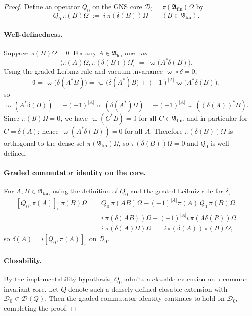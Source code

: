 \begin{proof}
Define an operator $Q_0$ on the GNS core $\mathcal D_0=\pi(\mathfrak A_{\mathrm{fin}})\Omega$
by
\[
Q_0\,\pi(B)\Omega \;:=\; i\,\pi(\delta(B))\Omega
\qquad(B\in\mathfrak A_{\mathrm{fin}}).
\]

\paragraph{Well-definedness.}
Suppose $\pi(B)\Omega=0$.  For any $A\in\mathfrak A_{\mathrm{fin}}$ one has
\[
\langle \pi(A)\Omega,\pi(\delta(B))\Omega\rangle
\;=\;
\varpi\!\big(A^*\delta(B)\big).
\]
Using the graded Leibniz rule and vacuum invariance $\varpi\circ\delta=0$,
\[
0
=\varpi\!\big(\delta(A^*B)\big)
=\varpi\!\big(\delta(A^*)B\big)+(-1)^{|A|}\varpi\!\big(A^*\delta(B)\big),
\]
so
$
\varpi(A^*\delta(B))=-(-1)^{|A|}\varpi(\delta(A^*)B)
=-(-1)^{|A|}\varpi((\delta(A))^*B).
$
Since $\pi(B)\Omega=0$, we have $\varpi(C^*B)=0$ for all $C\in\mathfrak A_{\mathrm{fin}}$,
and in particular for $C=\delta(A)$; hence $\varpi(A^*\delta(B))=0$ for all $A$.
Therefore $\pi(\delta(B))\Omega$ is orthogonal to the dense set
$\pi(\mathfrak A_{\mathrm{fin}})\Omega$, so $\pi(\delta(B))\Omega=0$ and $Q_0$ is well-defined.

\paragraph{Graded commutator identity on the core.}
For $A,B\in\mathfrak A_{\mathrm{fin}}$, using the definition of $Q_0$ and the graded
Leibniz rule for $\delta$,
\[
\begin{aligned}
[Q_0,\pi(A)]_{\mathrm s}\,\pi(B)\Omega
&=Q_0\,\pi(AB)\Omega-(-1)^{|A|}\pi(A)\,Q_0\,\pi(B)\Omega \\
&=i\,\pi(\delta(AB))\Omega-(-1)^{|A|}i\,\pi(A\delta(B))\Omega \\
&=i\,\pi(\delta(A)B)\Omega
\;=\; i\,\pi(\delta(A))\,\pi(B)\Omega,
\end{aligned}
\]
so $\delta(A)=i[Q_0,\pi(A)]_{\mathrm s}$ on $\mathcal D_0$.

\paragraph{Closability.}
By the implementability hypothesis, $Q_0$ admits a closable extension on a
common invariant core.  Let $Q$ denote such a densely defined closable
extension with $\mathcal D_0\subset\mathcal D(Q)$.  Then the graded commutator
identity continues to hold on $\mathcal D_0$, completing the proof.
\end{proof}

